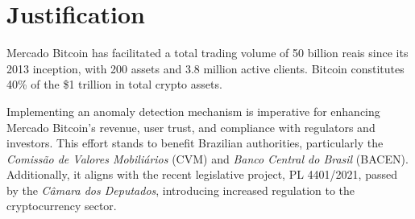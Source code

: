 \section{Justification}
Mercado Bitcoin has facilitated a total trading volume of 50 billion reais since its 2013 inception, with 200 assets and
3.8 million active clients. Bitcoin constitutes 40\% of the \$1 trillion in total crypto assets.

Implementing an anomaly detection mechanism is imperative for enhancing Mercado Bitcoin's revenue, user trust, and
compliance with regulators and investors. This effort stands to benefit Brazilian authorities, particularly the
\textit{Comissão de Valores Mobiliários} (CVM) and \textit{Banco Central do Brasil} (BACEN). Additionally, it aligns
with the recent legislative project, PL 4401/2021, passed by the \textit{Câmara dos Deputados}, introducing increased
regulation to the cryptocurrency sector.
